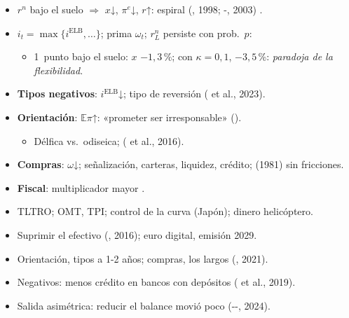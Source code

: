\documentclass{article}
\begin{document}
\begin{columnas}
\begin{itemize}
\item $r^n$ bajo el suelo $\Rightarrow$ $x$↓, $\pi^e$↓, $r$↑: espiral (, 1998; -, 2003) .
\end{itemize}
\begin{itemize}
\item $i_t=\max\{i^{\mathrm{ELB}},\dots\}$; prima $\omega_t$; $r^n_L$ persiste con prob.\ $p$:
  \begin{itemize}
  \item 1~punto bajo el suelo: $x$ $-1{,}3$\,\%; con $\kappa=0{,}1$, $-3{,}5$\,\%: \emph{paradoja de la flexibilidad}.
  \end{itemize}
\end{itemize}
\begin{itemize}
\item \textbf{Tipos negativos}: $i^{\mathrm{ELB}}$↓; tipo de reversión ( et al., 2023).
\item \textbf{Orientación}: $\mathbb E\pi$↑: «prometer ser irresponsable» ().
  \begin{itemize}
  \item Délfica vs.\ odiseica;  ( et al., 2016).
  \end{itemize}
\item \textbf{Compras}: $\omega$↓; señalización, carteras, liquidez, crédito;  (1981) sin fricciones.
\item \textbf{Fiscal}: multiplicador mayor .
\end{itemize}
\begin{itemize}
\item TLTRO; OMT, TPI; control de la curva (Japón); dinero helicóptero.
\item Suprimir el efectivo (, 2016); euro digital, emisión 2029.
\end{itemize}
\begin{itemize}
\item Orientación, tipos a 1-2 años; compras, los largos (, 2021).
\item Negativos: menos crédito en bancos con depósitos ( et al., 2019).
\item Salida asimétrica: reducir el balance movió poco (--, 2024).
\end{itemize}


\end{columnas}
\end{document}
